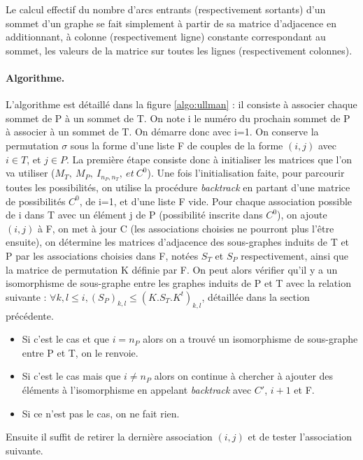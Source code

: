 Le calcul effectif du nombre d'arcs entrants (respectivement sortants) d'un sommet d'un graphe se fait simplement à partir de sa matrice d'adjacence en
additionnant, à colonne (respectivement ligne) constante correspondant au sommet, les valeurs de la matrice sur toutes les lignes (respectivement colonnes).


\paragraph{Algorithme.}
L'algorithme est détaillé dans la figure \ref{algo:ullman} : il consiste à associer chaque sommet de P à un sommet de T. On note i le numéro du prochain sommet de P à associer à un sommet de T. 
On démarre donc avec i=1.
On conserve la permutation $\sigma$ sous la forme d'une liste F de couples de la forme $(i, j)$ avec $i\in T$, et $j\in P$. 
La première étape consiste donc à initialiser les matrices que l'on va utiliser ($M_T,\ M_P,\ I_{n_P, n_T},\ et\ C^0$). Une fois l'initialisation faite, pour parcourir toutes les possibilités, on utilise la procédure \emph{backtrack} en partant d'une matrice de possibilités $C^0$, de i=1, et d'une liste F vide. 
Pour chaque association possible de i dans T avec un élément j de P (possibilité inscrite dans $C^0$), on ajoute $(i, j)$ à F, on met à jour C (les associations choisies ne pourront
plus l'être ensuite), on détermine les matrices d'adjacence des sous-graphes induits de T et P par les associations choisies dans F, notées $S_T$ et $S_P$ respectivement, ainsi que la matrice de permutation K définie par F.
On peut alors vérifier qu'il y a un isomorphisme de sous-graphe entre les graphes induits de P et T avec la relation suivante : $\forall k,l\leq i, (S_P)_{k,l}\leq (K.S_T.K^t)_{k,l}$, détaillée dans la section précédente.
\begin{itemize}
 \item Si c'est le cas et que $i=n_P$ alors on a trouvé un isomorphisme de sous-graphe entre P et T, on le renvoie.
 \item Si c'est le cas mais que $i\ne n_P$ alors on continue à chercher à ajouter des éléments à l'isomorphisme en appelant \emph{backtrack} avec $C'$, $i+1$ et F.
 \item Si ce n'est pas le cas, on ne fait rien.
\end{itemize}
Ensuite il suffit de retirer la dernière association $(i, j)$ et de tester l'association suivante. 


